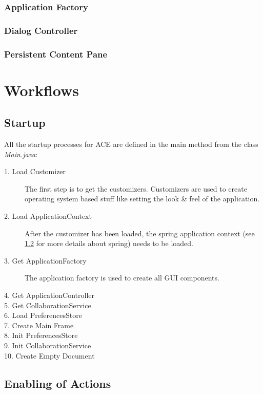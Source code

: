 \subsubsection{Application Factory}
\label{applicationlayer_applicationfactory}
\subsubsection{Dialog Controller}
\subsubsection{Persistent Content Pane}



\newpage
\section{Workflows}

\subsection{Startup}
All the startup processes for ACE are defined in the main method from the class \textit{Main.java}:
\begin{description}
\item[1. Load Customizer ] The first step is to get the customizers. Customizers are used to create operating system based stuff like setting the look \& feel of the application.
\item[2. Load ApplicationContext ] After the customizer has been loaded, the spring application context (see \ref{} for more details about spring) needs to be loaded.
\item[3. Get ApplicationFactory ] The application factory is used to create all GUI components.
\item[4. Get ApplicationController ]  
\item[5. Get CollaborationService ] 
\item[6. Load PreferencesStore ]
\item[7. Create Main Frame ]
\item[8. Init PreferencesStore ]
\item[9. Init CollaborationService ]
\item[10. Create Empty Document ]
\end{description}




\subsection{Enabling of Actions}


